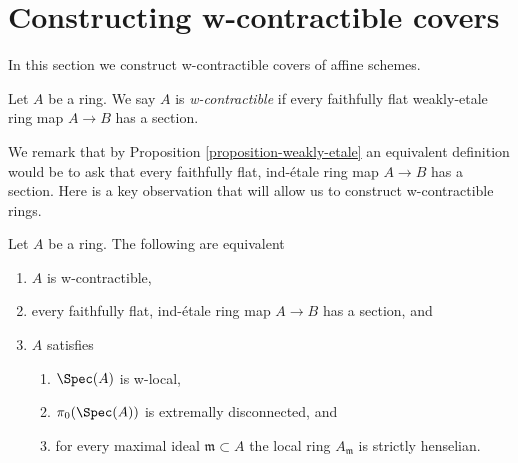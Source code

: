 \section{Constructing w-contractible covers}
\label{section-w-contractible}

\noindent
In this section we construct w-contractible covers of affine schemes.

\begin{definition}
\label{definition-w-contractible}
Let $A$ be a ring. We say $A$ is {\it w-contractible} if every
faithfully flat weakly-etale ring map $A \to B$ has a section.
\end{definition}

\noindent
We remark that by Proposition \ref{proposition-weakly-etale}
an equivalent definition would be to ask that every faithfully
flat, ind-\'etale ring map $A \to B$ has a section.
Here is a key observation that will allow us to construct
w-contractible rings.

\begin{lemma}
\label{lemma-w-local-strictly-henselian-extremally-disconnected}
Let $A$ be a ring. The following are equivalent
\begin{enumerate}
\item $A$ is w-contractible,
\item every faithfully flat, ind-\'etale ring map $A \to B$ has
a section, and
\item $A$ satisfies
\begin{enumerate}
\item $\Spec(A)$ is w-local,
\item $\pi_0(\Spec(A))$ is extremally disconnected, and
\item for every maximal ideal $\mathfrak m \subset A$ the
local ring $A_\mathfrak m$ is strictly henselian.
\end{enumerate}
\end{enumerate}
\end{lemma}

